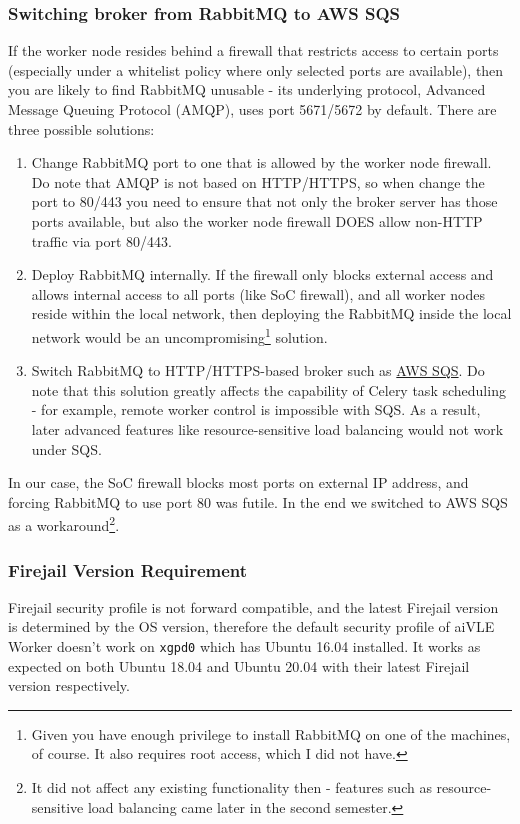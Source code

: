 \subsubsection{Switching broker from RabbitMQ to AWS SQS}
If the worker node resides behind a firewall that restricts access to certain ports (especially under a whitelist policy where only selected ports are available), then you are likely to find RabbitMQ unusable - its underlying protocol, Advanced Message Queuing Protocol (AMQP), uses port 5671/5672 by default. There are three possible solutions:
\begin{enumerate}
    \item Change RabbitMQ port to one that is allowed by the worker node firewall. Do note that AMQP is not based on HTTP/HTTPS, so when change the port to 80/443 you need to ensure that not only the broker server has those ports available, but also the worker node firewall DOES allow non-HTTP traffic via port 80/443.
    \item Deploy RabbitMQ internally. If the firewall only blocks external access and allows internal access to all ports (like SoC firewall), and all worker nodes reside within the local network, then deploying the RabbitMQ inside the local network would be an uncompromising\footnote{Given you have enough privilege to install RabbitMQ on one of the machines, of course. It also requires root access, which I did not have.} solution.
    \item Switch RabbitMQ to HTTP/HTTPS-based broker such as \href{https://aws.amazon.com/sqs/}{AWS SQS}. Do note that this solution greatly affects the capability of Celery task scheduling - for example, remote worker control is impossible with SQS. As a result, later advanced features like resource-sensitive load balancing would not work under SQS.
\end{enumerate}
In our case, the SoC firewall blocks most ports on external IP address, and forcing RabbitMQ to use port 80 was futile. In the end we switched to AWS SQS as a workaround\footnote{It did not affect any existing functionality then - features such as resource-sensitive load balancing came later in the second semester.}.

\subsubsection{Firejail Version Requirement}
Firejail security profile is not forward compatible, and the latest Firejail version is determined by the OS version, therefore the default security profile of aiVLE Worker doesn't work on  \texttt{xgpd0} which has Ubuntu 16.04 installed. It works as expected on both Ubuntu 18.04 and Ubuntu 20.04 with their latest Firejail version respectively.

